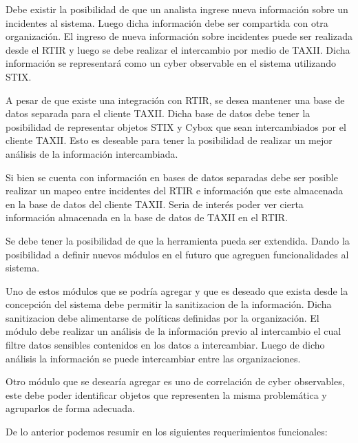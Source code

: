\documentclass[11pt]{article}
\begin{document}
\bigskip

Debe existir la posibilidad de que un analista ingrese nueva información sobre un incidentes al sistema. Luego dicha información debe ser compartida con otra organización. El ingreso de nueva información sobre incidentes puede ser realizada desde el RTIR y luego se debe realizar el intercambio por medio de TAXII. 
Dicha información se representará como un cyber observable en el sistema utilizando STIX.


\bigskip

A pesar de que existe una integración con RTIR, se desea mantener una base de datos separada para el cliente TAXII. Dicha base de datos debe tener la posibilidad de representar objetos STIX y Cybox que sean intercambiados por el cliente TAXII. Esto es deseable para tener la posibilidad de realizar un mejor análisis de la información intercambiada.


\bigskip

Si bien se cuenta con información en bases de datos separadas debe ser posible realizar un mapeo entre incidentes del RTIR e información que este almacenada en la base de datos del cliente TAXII. Seria de interés poder ver cierta información almacenada en la base de datos de TAXII en el RTIR.


\bigskip

Se debe tener la posibilidad de que la herramienta pueda ser extendida. Dando la posibilidad a definir nuevos módulos en el futuro que agreguen funcionalidades al sistema.


\bigskip

Uno de estos módulos que se podría agregar y que es deseado que exista desde la concepción del sistema debe permitir la sanitizacion de la información. Dicha sanitizacion debe alimentarse de políticas definidas por la organización. El módulo debe realizar un análisis de la información previo al intercambio el cual filtre datos sensibles contenidos en los datos a intercambiar. Luego de dicho análisis la información se puede intercambiar entre las organizaciones.


\bigskip

Otro módulo que se desearía agregar es uno de correlación de cyber observables, este debe poder identificar objetos que representen la misma problemática y agruparlos de forma adecuada.


\bigskip

De lo anterior podemos resumir en los siguientes requerimientos funcionales:
\end{document}
